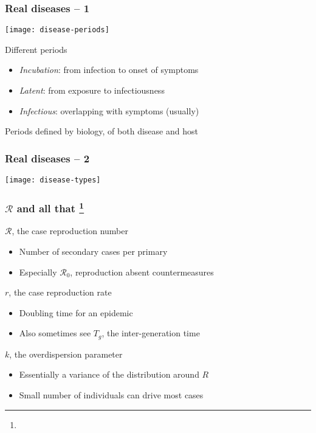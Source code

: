 \documentclass{beamer}
\renewcommand{\cite}[1]{
  \footnote[frame]{\tiny{\bibentry{#1}}}
}
\begin{document}
\begin{frame}
  \frametitle{Real diseases -- 1}

  \begin{center}
    \texttt{[image: disease-periods]}          
  \end{center}

  \begin{block}{Different periods}
    \begin{itemize}
    \item \emph{Incubation}: from infection to onset of symptoms
    \item \emph{Latent}: from exposure to infectiousness
    \item \emph{Infectious}: overlapping with symptoms (usually)
    \end{itemize}
  \end{block}
  
  \begin{block}{Periods defined by biology, of both disease and host}
  \end{block}
\end{frame}

\begin{frame}
  \frametitle{Real diseases -- 2}

  \begin{center}
    \texttt{[image: disease-types]}          
  \end{center}

\end{frame}

\begin{frame}
  \frametitle{$\mathcal{R}$ and all that\cite{R}}

  \begin{block}{$\mathcal{R}$, the case reproduction number}
    \begin{itemize}
    \item Number of secondary cases per primary
    \item Especially $\mathcal{R}_0$, reproduction absent countermeasures
    \end{itemize}
  \end{block}

  \begin{block}{$r$, the case reproduction rate}
    \begin{itemize}
    \item Doubling time for an epidemic
    \item Also sometimes see $T_g$, the inter-generation time
    \end{itemize}
  \end{block}

  \begin{block}{$k$, the overdispersion parameter}
    \begin{itemize}
    \item Essentially a variance of the distribution around $R$
    \item Small number of individuals can drive most cases
    \end{itemize}
  \end{block}
\end{frame}
\end{document}
